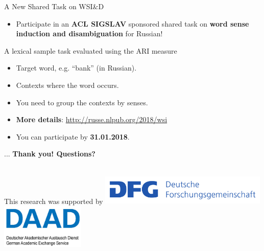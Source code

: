\documentclass{beamer}
\begin{document}
\begin{frame}{A New Shared Task on WSI\&D}
  
  \begin{itemize}
  \item Participate in an \textbf{\alert{ACL SIGSLAV}} sponsored shared task on \textbf{word sense induction and disambiguation} for Russian!
  
  
 \end{itemize} 
  
  \begin{block}{A lexical sample task evaluated using the ARI measure }
  \begin{itemize}
  	\item Target word, e.g. ``bank'' (in Russian).
  	\item Contexts where the word occurs.
  	\item You need to group the contexts by senses.
  \end{itemize}
   \end{block}
  
  \pause
  \begin{itemize}
    \item \textbf{More details}: \url{http://russe.nlpub.org/2018/wsi}
  \item You can participate by \textbf{31.01.2018}.
     
  \end{itemize}
  
\end{frame}

\begin{frame}{ ... }
\Huge{\textbf{Thank you! Questions?}}

\\ 

{\normalsize This research was supported by}
\includegraphics[width=0.6\textwidth]{dfg} \includegraphics[width=0.3\textwidth]{daad}

\end{frame}



\end{document}
